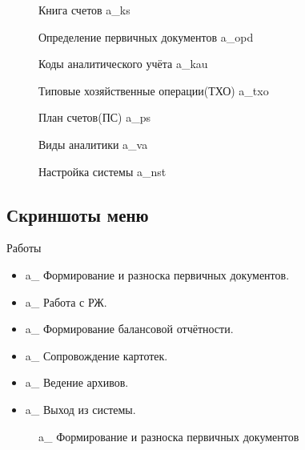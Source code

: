 \begin{figure}[h!]
    \centering
    \caption{Книга счетов \gpiFIO\/a\_ks}
\end{figure}

\begin{figure}[h!]
    \centering
    \caption{Определение первичных документов \gpiFIO\/a\_opd}
\end{figure}

\begin{figure}[h!]
    \centering
    \caption{Коды аналитического учёта \gpiFIO\/a\_kau}
\end{figure}

\begin{figure}[h!]
    \centering
    \caption{Типовые хозяйственные операции(ТХО) \gpiFIO\/a\_txo}
\end{figure}

\begin{figure}[h!]
    \centering
    \caption{План счетов(ПС) \gpiFIO\/a\_ps}
\end{figure}

\begin{figure}[h!]
    \centering
    \caption{Виды аналитики \gpiFIO\/a\_va}
\end{figure}

\begin{figure}[h!]
    \centering
    \caption{Настройка системы \gpiFIO\/a\_nst}
\end{figure}

\newpage

\subsection{Скриншоты меню}

Работы

\begin{itemize}
    \item \gpiFIO\/a\_ Формирование и разноска первичных документов.
    \item \gpiFIO\/a\_ Работа с РЖ.
    \item \gpiFIO\/a\_ Формирование балансовой отчётности.
    \item \gpiFIO\/a\_ Сопровождение картотек.
    \item \gpiFIO\/a\_ Ведение архивов.
    \item \gpiFIO\/a\_ Выход из системы.
\end{itemize}

\begin{figure}[h!]
    \centering
    \caption{\gpiFIO\/a\_ Формирование и разноска первичных документов}
\end{figure}

